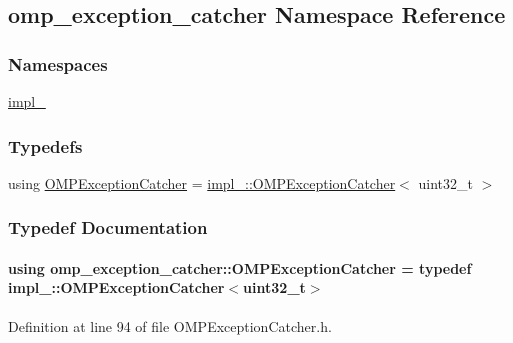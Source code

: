 \hypertarget{namespaceomp__exception__catcher}{}\subsection{omp\+\_\+exception\+\_\+catcher Namespace Reference}
\label{namespaceomp__exception__catcher}
\subsubsection*{Namespaces}
\begin{DoxyCompactItemize}
\item 
 \hyperlink{namespaceomp__exception__catcher_1_1impl__}{impl\+\_\+}
\end{DoxyCompactItemize}
\subsubsection*{Typedefs}
\begin{DoxyCompactItemize}
\item 
using \hyperlink{namespaceomp__exception__catcher_aed0913d080b088280707d30970f82129}{O\+M\+P\+Exception\+Catcher} = \hyperlink{classomp__exception__catcher_1_1impl___1_1OMPExceptionCatcher}{impl\+\_\+\+::\+O\+M\+P\+Exception\+Catcher}$<$ uint32\+\_\+t $>$
\end{DoxyCompactItemize}


\subsubsection{Typedef Documentation}
\paragraph[{\texorpdfstring{O\+M\+P\+Exception\+Catcher}{OMPExceptionCatcher}}]{\setlength{\rightskip}{0pt plus 5cm}using {\bf omp\+\_\+exception\+\_\+catcher\+::\+O\+M\+P\+Exception\+Catcher} = typedef {\bf impl\+\_\+\+::\+O\+M\+P\+Exception\+Catcher}$<$uint32\+\_\+t$>$}\hypertarget{namespaceomp__exception__catcher_aed0913d080b088280707d30970f82129}{}\label{namespaceomp__exception__catcher_aed0913d080b088280707d30970f82129}


Definition at line 94 of file O\+M\+P\+Exception\+Catcher.\+h.

